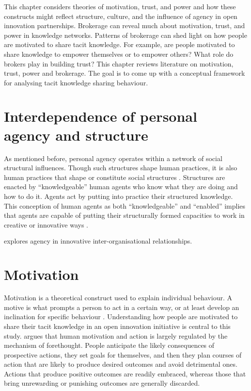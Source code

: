 This chapter considers theories of motivation, trust, and power and how these constructs might reflect structure, culture, and the influence of agency in open innovation partnerships. Brokerage can reveal much about motivation, trust, and power in knowledge networks. Patterns of brokerage can shed light on how people are motivated to share tacit knowledge. For example, are people motivated to share knowledge to empower themselves or to empower others? What role do brokers play in building trust? This chapter reviews literature on motivation, trust, power and brokerage. The goal is to come up with a conceptual framework for analysing tacit knowledge sharing behaviour.\medskip 

\section{Interdependence of personal agency and structure}

As mentioned before, personal agency operates within a network of social structural influences. Though such structures shape human practices, it is also human practices that shape or constitute social structures \citep{sewell1992theory}. Structures are enacted by \enquote{knowledgeable} human agents who know what they are doing and how to do it. Agents act by putting into practice their structured knowledge. This conception of human agents as both \enquote{knowledgeable} and \enquote{enabled} implies that agents are capable of putting their structurally formed capacities to work in creative or innovative ways \citep{giddens1984constitution}. \medskip

\citet{davis2010agency} explores agency in innovative inter-organisational relationships.



\section{Motivation}

Motivation is a theoretical construct used to explain individual behaviour. A motive is what prompts a person to act in a certain way, or at least develop an inclination for specific behaviour \citep{pardee1990motivation}. Understanding how people are motivated to share their tacit knowledge in an open innovation initiative is central to this study. \citet{bandura1999social} argues that human motivation and action is largely regulated by the mechanism of forethought. People anticipate the likely consequences of prospective actions, they set goals for themselves, and then they plan courses of action that are likely to produce desired outcomes and avoid detrimental ones. Actions that produce positive outcomes are readily embraced, whereas those that bring unrewarding or punishing outcomes are generally discarded.

